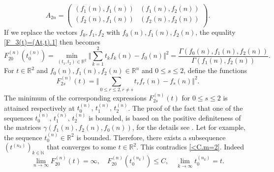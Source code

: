 \documentclass[preprint,12pt]{elsarticle}
\numberwithin{equation}{section}
\begin{document}
%
\begin{equation}
\label{A(3n).3}
A_{2n}\!=\!
\left(\!\!\begin{array}{cc}
(f_1(n),f_1(n))&(f_1(n),f_2(n))\\
(f_2(n),f_1(n))&(f_2(n),f_2(n))\\
\end{array}\!\!\right).
\end{equation}
%
If we replace the vectors $f_0,f_1,f_2$ with $f_0(n),f_1(n),f_2(n)$, 
the equality  \eqref{F_3(t)=(At,t).1} then becomes 
\begin{equation}
 \label{F_3n(t)=(At,t).3}
 F^{(n)}_{20}(t^{(n)}_0)=\min_{(t_1,t_2)\in \mathbb R^2}
 \Vert\sum_{k=1}^2t_kf_k(n)-f_0(n)\Vert ^2=
\frac{\Gamma(f_0(n),f_1(n),f_2(n))}{\Gamma(f_1(n),f_2(n))}.
\end{equation}
For $t\in \mathbb R^2$ and $f_0(n),f_1(n),f_2(n)\in \mathbb R^n$
and $0\leq s\leq 2$,  define the functions
\begin{equation}
 \label{F(2s)(t)}
F^{(n)}_{2s}(t)=\Vert \sum_{0\leq r\leq 2,r\not=s}t_rf_r(n)-f_s(n)\Vert ^2.
\end{equation}
The minimum of the corresponding 
expressions $F^{(n)}_{2s}(t)$ for $0\leq s \leq 2$ is attained respectively  at $t^{(n)}_0,\,t^{(n)}_1,\,t^{(n)}_2$. 
The proof of the fact that one of the sequences 
$
t^{(n)}_0,\,t^{(n)}_1,\,t^{(n)}_2
$ 
is bounded, is based on the positive definiteness 
of the matrices 
$\gamma(f_1(n),f_2(n),f_0(n))$, for the details see \cite{Kos-m-Arx23}. Let for example, the sequence $t^{(n)}_0\in \mathbb R^2$ is bounded. Therefore,  there exists a subsequence $(t^{(n_k)})_{k\in \mathbb N}$ that converges to some $t\in \mathbb R^2$. This contradics \eqref{<C.m=2}. Indeed
\begin{equation}
\label{Contr.m=2}
\lim_{n\to \infty}F^{(n)}_{20}(t)=\infty,\quad  F^{(n)}_{20}(t_0^{(n_k)})\leq C,\quad
\lim_{k\to \infty}t_0^{(n_k)}=t.
\end{equation}
\end{document}
